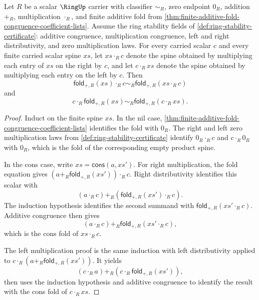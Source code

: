 \begin{lemma}
\label{lem:scalar-product-distributes-across-finite-additive-folds}
Let $R$ be a scalar $\RingUp$ carrier with classifier $\sim_R$, zero endpoint $0_R$, addition $+_R$, multiplication $\cdot_R$, and finite additive fold from \autoref{thm:finite-additive-fold-congruence-coefficient-lists}. Assume the ring stability fields of \autoref{def:ring-stability-certificate}: additive congruence, multiplication congruence, left and right distributivity, and zero multiplication laws. For every carried scalar $c$ and every finite carried scalar spine $xs$, let $xs\cdot_R c$ denote the spine obtained by multiplying each entry of $xs$ on the right by $c$, and let $c\cdot_R xs$ denote the spine obtained by multiplying each entry on the left by $c$. Then
$$
\mathsf{fold}_{+,R}(xs)\cdot_R c
\sim_R
\mathsf{fold}_{+,R}(xs\cdot_R c)
$$
and
$$
c\cdot_R\mathsf{fold}_{+,R}(xs)
\sim_R
\mathsf{fold}_{+,R}(c\cdot_R xs).
$$
\end{lemma}
\begin{proof}
Induct on the finite spine $xs$. In the nil case, \autoref{thm:finite-additive-fold-congruence-coefficient-lists} identifies the fold with $0_R$. The right and left zero multiplication laws from \autoref{def:ring-stability-certificate} identify $0_R\cdot_R c$ and $c\cdot_R0_R$ with $0_R$, which is the fold of the corresponding empty product spine.

In the cons case, write $xs=\mathsf{cons}(a,xs')$. For right multiplication, the fold equation gives $(a+_R\mathsf{fold}_{+,R}(xs'))\cdot_R c$. Right distributivity identifies this scalar with
$$
(a\cdot_R c)+_R(\mathsf{fold}_{+,R}(xs')\cdot_R c).
$$
The induction hypothesis identifies the second summand with $\mathsf{fold}_{+,R}(xs'\cdot_R c)$. Additive congruence then gives
$$
(a\cdot_R c)+_R\mathsf{fold}_{+,R}(xs'\cdot_R c),
$$
which is the cons fold of $xs\cdot_R c$.

The left multiplication proof is the same induction with left distributivity applied to $c\cdot_R(a+_R\mathsf{fold}_{+,R}(xs'))$. It yields
$$
(c\cdot_R a)+_R(c\cdot_R\mathsf{fold}_{+,R}(xs')),
$$
then uses the induction hypothesis and additive congruence to identify the result with the cons fold of $c\cdot_R xs$.
\end{proof}


